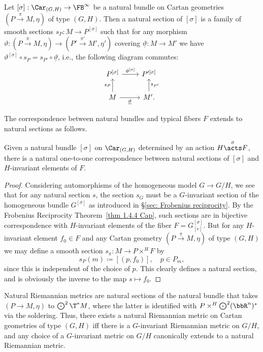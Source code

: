 \begin{defn}
    Let $[\sigma]:\Car_{(G,H)}\to \FB^\infty$ be a natural bundle on Cartan geometries $(P\overset{\pi}{\to}M,\eta)$ of type $(G,H)$. Then a natural section of $[\sigma]$ is a family of smooth sections $s_{P}:M\to P^{[\sigma]}$ such that for any morphism $\vartheta:(P\overset{\pi}{\to} M,\eta)\to (P'\overset{\pi'}{\to} M',\eta')$ covering $\underline{\vartheta}:M\to M'$ we have $\vartheta^{[\sigma]}\circ s_P=s_{P'}\circ \underline{\vartheta}$, i.e., the following diagram commutes:
    \[
    \begin{tikzcd}
        P^{[\sigma]}\arrow[r,"\vartheta^{[\sigma]}"] & P^{\prime[\sigma]}\\
        M\arrow[u,"s_P"]\arrow[r,swap,"\underline{\vartheta}"]& M'.\arrow[u,swap,"s_{P'}"]
    \end{tikzcd}
    \]
\end{defn}

The correspondence between natural bundles and typical fibers $F$ extends to natural sections as follows.

\begin{prop}\label{prop natural sections}
    Given a natural bundle $[\sigma]$ on $\Car_{(G,H)}$ determined by an action $H\overset{\sigma}{\acts}F$, there is a natural one-to-one correspondence between natural sections of $[\sigma]$ and $H$-invariant elements of $F$.
\end{prop}
\begin{proof}
    Considering automorphisms of the homogeneous model $G\to G\slash H$, we see that for any natural section $s$, the section $s_G$ must be a $G$-invariant section of the homogeneous bundle $G^{[\sigma]}$ as introduced in \S\ref{sec: Frobenius reciprocity}. By the Frobenius Reciprocity Theorem~\ref{thm 1.4.4 Cap}, such sections are in bijective correspondence with $H$-invariant elements of the fiber $F=G^{[\sigma]}_{[e]}$.
    But for any $H$-invariant element $f_0\in F$ and any Cartan geometry $(P\overset{\pi}{\to}M,\eta)$ of type $(G,H)$ we may define a smooth section $s_\pi:M\to P\times^H F$ by 
    \[s_P(m)\coloneqq [(p,f_0)],\quad p\in P_m,\]
    since this is independent of the choice of $p$.  This clearly defines a natural section, and is obviously the inverse to the map $s\mapsto f_0$.
\end{proof}

\begin{example}
    Natural Riemannian metrics are natural sections of the natural bundle that takes $(P\to M,\eta)$ to $\bigodot\nolimits^2 \T^\ast M$, where the latter is identified with $P\times^H \bigodot\nolimits^2(\bbR^n)^\ast$ via the soldering. Thus, there exists a natural Riemannian metric on Cartan geometries of type $(G,H)$ iff there is a $G$-invariant Riemannian metric on $G\slash H$, and any choice of a $G$-invariant metric on $G\slash H$ canonically extends to a natural Riemannian metric.
\end{example}


